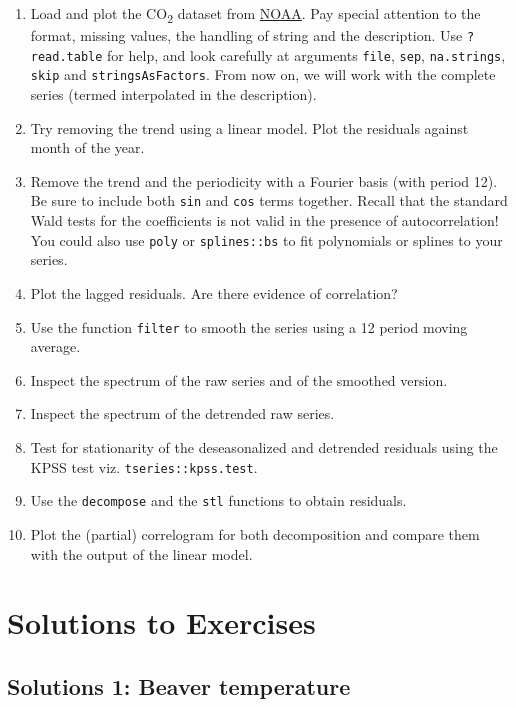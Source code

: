\documentclass[]{book}
\providecommand{\tightlist}{%
  \setlength{\itemsep}{0pt}\setlength{\parskip}{0pt}}
\begin{document}
\begin{enumerate}
\def\labelenumi{\arabic{enumi}.}
\tightlist
\item
  Load and plot the CO\textsubscript{2} dataset from
  \href{ftp://aftp.cmdl.noaa.gov/products/trends/co2/co2_mm_mlo.txt}{NOAA}.
  Pay special attention to the format, missing values, the handling of
  string and the description. Use \texttt{?read.table} for help, and
  look carefully at arguments \texttt{file}, \texttt{sep},
  \texttt{na.strings}, \texttt{skip} and \texttt{stringsAsFactors}. From
  now on, we will work with the complete series (termed interpolated in
  the description).
\item
  Try removing the trend using a linear model. Plot the residuals
  against month of the year.
\item
  Remove the trend and the periodicity with a Fourier basis (with period
  12). Be sure to include both \texttt{sin} and \texttt{cos} terms
  together. Recall that the standard Wald tests for the coefficients is
  not valid in the presence of autocorrelation! You could also use
  \texttt{poly} or \texttt{splines::bs} to fit polynomials or splines to
  your series.
\item
  Plot the lagged residuals. Are there evidence of correlation?
\item
  Use the function \texttt{filter} to smooth the series using a 12
  period moving average.
\item
  Inspect the spectrum of the raw series and of the smoothed version.
\item
  Inspect the spectrum of the detrended raw series.
\item
  Test for stationarity of the deseasonalized and detrended residuals
  using the KPSS test viz. \texttt{tseries::kpss.test}.
\item
  Use the \texttt{decompose} and the \texttt{stl} functions to obtain
  residuals.
\item
  Plot the (partial) correlogram for both decomposition and compare them
  with the output of the linear model.
\end{enumerate}

\section{Solutions to Exercises}\label{solutions-to-exercises}

\subsection{Solutions 1: Beaver
temperature}\label{solutions-1-beaver-temperature}
\end{document}
